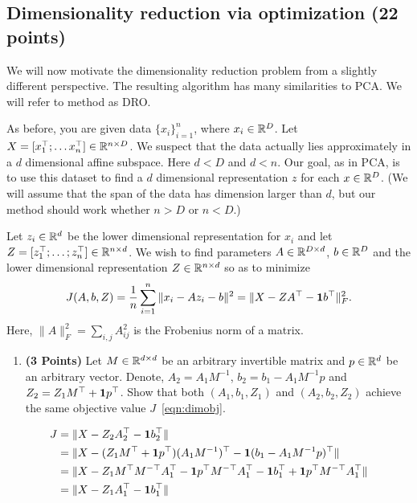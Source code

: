 \begin{enumerate}



\end{enumerate}


\subsection{Dimensionality reduction via optimization (22 points)}

We will now motivate the dimensionality reduction problem from a slightly different
perspective. The resulting algorithm has many similarities to PCA.
We will refer to method as DRO.

As before, you are given data $\{x_i\}_{i=1}^n$, where $x_i \in \mathbb{R}^D$. Let $X=[x_1^\top; \dots
x_n^\top] \in \mathbb{R}^{n\times D}$. We suspect that the data
actually lies approximately in  a $d$ dimensional affine subspace.
Here $d<D$ and $d<n$.
Our goal, as in PCA, is to use this dataset to find a $d$ dimensional representation $z$ for each $x\in\mathbb{R}^D$.
(We will assume that the span of the data has dimension larger than
$d$, but our method should work whether $n>D$ or $n<D$.)


Let $z_i\in \mathbb{R}^d$ be the lower dimensional representation for $x_i$ and
let $Z = [z_1^\top; \dots; z_n^\top] \in \mathbb{R}^{n\times d}$.
We wish to find parameters $A \in \mathbb{R}^{D\times d}$, $b\in\mathbb{R}^D$ and the lower
dimensional representation $Z\in \mathbb{R}^{n\times d}$ so as to minimize 
\begin{equation}
J(A,b,Z) = \frac{1}{n} \sum_{i=1}^n \|x_i - Az_i - b\|^2 = \| X - ZA^\top - {\bf 1} b^\top\|_F^2.
\label{eqn:dimobj}
\end{equation}
Here, $\|A\|^2_F = \sum_{i,j} A_{ij}^2$ is the Frobenius norm of a matrix.


\begin{enumerate}
\item \textbf{(3 Points)}
Let $M\in\mathbb{R}^{d\times d}$ be an arbitrary invertible matrix and $p\in\mathbb{R}^{d}$ be an arbitrary vector.
Denote, $A_2 = A_1M^{-1}$, $b_2 = b_1- A_1M^{-1}p$ and $Z_2 = Z_1 M^\top +
{\bf 1} p^\top$.
Show that both
$(A_1, b_1, Z_1)$ and $(A_2, b_2, Z_2)$ achieve the same objective value $J$~\eqref{eqn:dimobj}.
\end{enumerate}

\begin{soln}
  $$
  \begin{aligned}
    J & = \| X - Z_2A_2^\top - {\bf 1} b_2^\top \| \\
    & = \| X - (Z_1 M^\top + {\bf 1} p^\top)(A_1M^{-1})^\top - {\bf 1} (b_1- A_1M^{-1}p)^\top \| \\
    & = \| X - Z_1 M^\top M^{-\top}A_1^\top - {\bf 1} p^\top M^{-\top}A_1^\top - {\bf 1} b_1^\top + {\bf 1} p^\top M^{-\top}A_1^\top \| \\
    & = \| X - Z_1A_1^\top - {\bf 1} b_1^\top \|
  \end{aligned}
  $$
\end{soln}

